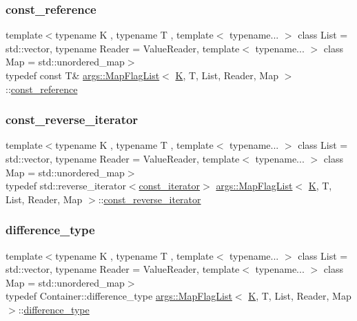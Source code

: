 \subsubsection{\texorpdfstring{const\+\_\+reference}{const\_reference}}
{\footnotesize\ttfamily template$<$typename K , typename T , template$<$ typename... $>$ class List = std\+::vector, typename Reader  = Value\+Reader, template$<$ typename... $>$ class Map = std\+::unordered\+\_\+map$>$ \\
typedef const T\& \hyperlink{classargs_1_1_map_flag_list}{args\+::\+Map\+Flag\+List}$<$ \hyperlink{cgal__test_8cpp_a891e241aa245ae63618f03737efba309}{K}, T, List, Reader, Map $>$\+::\hyperlink{classargs_1_1_map_flag_list_a68a39fcca6b7b4937d1a04c21b9749e5}{const\+\_\+reference}}

\mbox{\label{classargs_1_1_map_flag_list_ad2ab0776f807550d0f4c86bb885a6a0c}} 
\subsubsection{\texorpdfstring{const\+\_\+reverse\+\_\+iterator}{const\_reverse\_iterator}}
{\footnotesize\ttfamily template$<$typename K , typename T , template$<$ typename... $>$ class List = std\+::vector, typename Reader  = Value\+Reader, template$<$ typename... $>$ class Map = std\+::unordered\+\_\+map$>$ \\
typedef std\+::reverse\+\_\+iterator$<$\hyperlink{classargs_1_1_map_flag_list_a6b59eb2e45bf0e576d01b902f3c7a0d7}{const\+\_\+iterator}$>$ \hyperlink{classargs_1_1_map_flag_list}{args\+::\+Map\+Flag\+List}$<$ \hyperlink{cgal__test_8cpp_a891e241aa245ae63618f03737efba309}{K}, T, List, Reader, Map $>$\+::\hyperlink{classargs_1_1_map_flag_list_ad2ab0776f807550d0f4c86bb885a6a0c}{const\+\_\+reverse\+\_\+iterator}}

\mbox{\label{classargs_1_1_map_flag_list_a704d125e630642ceb306b88b2059ec47}} 
\subsubsection{\texorpdfstring{difference\+\_\+type}{difference\_type}}
{\footnotesize\ttfamily template$<$typename K , typename T , template$<$ typename... $>$ class List = std\+::vector, typename Reader  = Value\+Reader, template$<$ typename... $>$ class Map = std\+::unordered\+\_\+map$>$ \\
typedef Container\+::difference\+\_\+type \hyperlink{classargs_1_1_map_flag_list}{args\+::\+Map\+Flag\+List}$<$ \hyperlink{cgal__test_8cpp_a891e241aa245ae63618f03737efba309}{K}, T, List, Reader, Map $>$\+::\hyperlink{classargs_1_1_map_flag_list_a704d125e630642ceb306b88b2059ec47}{difference\+\_\+type}}

